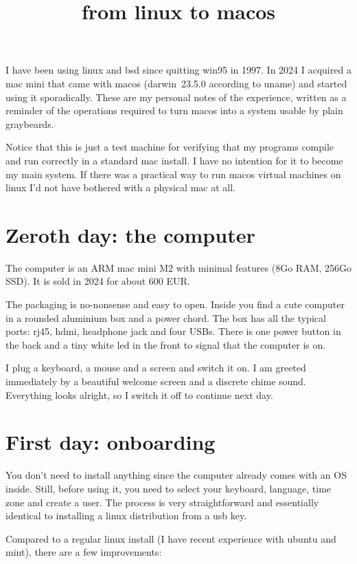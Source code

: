 \title{from linux to macos}

I have been using linux and bsd since quitting win95 in 1997.  In 2024 I
acquired a mac mini that came with macos (darwin~23.5.0 according to
uname) and started using it sporadically.  These are my personal notes of the
experience, written as a reminder of the operations required to turn macos
into a system usable by plain graybeards.

Notice that this is just a test machine for verifying that my programs
compile and run correctly in a standard mac install.  I have no intention for
it to become my main system.  If there was a practical way to run macos
virtual machines on linux I'd not have bothered with a physical mac at all.

\section*{Zeroth day: the computer}

The computer is an ARM mac mini M2 with minimal features (8Go RAM, 256Go
SSD).  It is sold in 2024 for about 600 EUR.

The packaging is no-nonsense and easy to open.  Inside you find a cute
computer in a rounded aluminium box and a power chord.  The box has all the
typical ports: rj45, hdmi, headphone jack and four USBs.  There is one
power button in the back and a tiny white led in the front to signal that
the computer is on.

I plug a keyboard, a mouse and a screen and switch it on.  I am greeted
immediately by a beautiful welcome screen and a discrete chime sound.
Everything looks alright, so I switch it off to continue next day.

\section*{First day: onboarding}

You don't need to install anything since the computer already comes with an
OS inside.  Still, before using it, you need to select your keyboard,
language, time zone and create a user.  The process is very straightforward
and essentially identical to installing a linux distribution from a usb key.

Compared to a regular linux install (I have recent experience with ubuntu and
mint), there are a few improvements:

